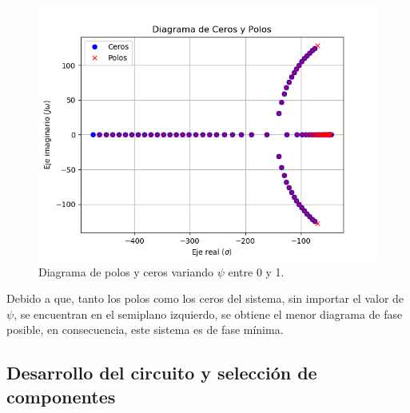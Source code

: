 \documentclass[a4paper]{article}
\begin{document}
\begin{figure}[H]
	\includegraphics[width=\textwidth]{Imagenes/Zplanepsi.png}
\caption{Diagrama de polos y ceros variando $\psi$ entre 0 y 1.}
	\label{fig:zplanepsi}
\end{figure}

Debido a que, tanto los polos como los ceros del sistema, sin importar el valor de $\psi$, se encuentran en el semiplano izquierdo, se obtiene el menor diagrama de fase posible, en consecuencia, este sistema es de fase mínima. 

\subsection{Desarrollo del circuito y selección de componentes}
\end{document}
